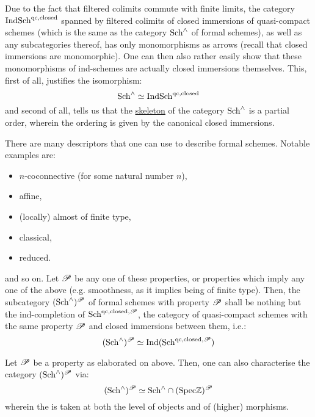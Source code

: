                 \begin{remark} \label{remark: morphisms_of_formal_schemes}
                    Due to the fact that filtered colimits commute with finite limits, the category $\mathrm{Ind}\mathrm{Sch}^{\mathrm{qc}, \mathrm{closed}}$ spanned by filtered colimits of closed immersions of quasi-compact schemes (which is the same as the category $\mathrm{Sch}^{\wedge}$ of formal schemes), as well as any subcategories thereof, has only monomorphisms as arrows (recall that closed immersions are monomorphic). One can then also rather easily show that these monomorphisms of ind-schemes are actually closed immersions themselves. This, first of all, justifies the isomorphism:
                        $$\mathrm{Sch}^{\wedge} \simeq \mathrm{Ind}\mathrm{Sch}^{\mathrm{qc}, \mathrm{closed}}$$
                    and second of all, tells us that the \href{https://ncatlab.org/nlab/show/skeleton}{\underline{skeleton}} of the category $\mathrm{Sch}^{\wedge}$ is a partial order, wherein the ordering is given by the canonical closed immersions. 
                \end{remark}
                
                \begin{definition} \label{def: formal_schemes_descriptors}
                    There are many descriptors that one can use to describe formal schemes. Notable examples are:
                        \begin{itemize}
                            \item $n$-coconnective (for some natural number $n$),
                            \item affine,
                            \item (locally) almost of finite type,
                            \item classical,
                            \item reduced.
                        \end{itemize}
                    and so on. Let $\mathscr{P}$ be any one of these properties, or properties which imply any one of the above (e.g. smoothness, as it implies being of finite type). Then, the subcategory $(\mathrm{Sch}^{\wedge})^{\mathscr{P}}$ of formal schemes with property $\mathscr{P}$ shall be nothing but the ind-completion of $\mathrm{Sch}^{\mathrm{qc}, \mathrm{closed}, \mathscr{P}}$, the category of quasi-compact schemes with the same property $\mathscr{P}$ and closed immersions between them, i.e.:
                        $$(\mathrm{Sch}^{\wedge})^{\mathscr{P}} \simeq \mathrm{Ind}(\mathrm{Sch}^{\mathrm{qc}, \mathrm{closed}, \mathscr{P}})$$
                \end{definition}
                \begin{remark}
                    Let $\mathscr{P}$ be a property as elaborated on above. Then, one can also characterise the category $(\mathrm{Sch}^{\wedge})^{\mathscr{P}}$ via:
                        $$(\mathrm{Sch}^{\wedge})^{\mathscr{P}} \simeq \mathrm{Sch}^{\wedge} \cap (\mathrm{Spec} \mathbb{Z})^{\mathscr{P}}$$
                    wherein the  is taken at both the level of objects and of (higher) morphisms.
                \end{remark}
                
